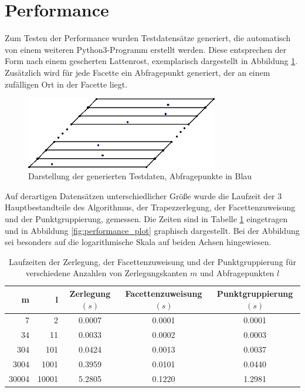 \documentclass[11pt, a4paper]{article}
\begin{document}
\section{Performance}
Zum Testen der Performance wurden Testdatensätze generiert, die automatisch von einem weiteren Python3-Programm erstellt werden. Diese entsprechen der Form nach einem gescherten Lattenrost, exemplarisch dargestellt in Abbildung \ref{fig:generated_dataset}. Zusätzlich wird für jede Facette ein Abfragepunkt generiert, der an einem zufälligen Ort in der Facette liegt.

\begin{figure}[h!]
	\centering
	\includegraphics[width=0.75\textwidth]{generated_dataset}
	\caption{Darstellung der generierten Testdaten, Abfragepunkte in Blau}
	\label{fig:generated_dataset}
\end{figure}

Auf derartigen Datensätzen unterschiedlicher Größe wurde die Laufzeit der 3 Hauptbestandteile des Algorithmus, der Trapezzerlegung, der Facettenzuweisung und der Punktgruppierung, gemessen. Die Zeiten sind in Tabelle \ref{tab:performance_table} eingetragen und in Abbildung \ref{fig:performance_plot} graphisch dargestellt. Bei der Abbildung sei besonders auf die logarithmische Skala auf beiden Achsen hingewiesen.

\begin{table}[h!]
	\centering
	\begin{tabular}{|r|r|c|c|c|}
		\hline
		m & l & Zerlegung $(s)$ & Facettenzuweisung $(s)$ & Punktgruppierung $(s)$ \\
		\hline
		7 & 2 & 0.0007 & 0.0001 & 0.0001 \\
		34 & 11 & 0.0033 & 0.0002 & 0.0003 \\
		304 & 101 & 0.0424 & 0.0013 & 0.0037 \\
		3004 & 1001 & 0.3959 & 0.0101 & 0.0440 \\
		30004 & 10001 & 5.2805 & 0.1220 & 1.2981 \\
		\hline
	\end{tabular}
	\caption{Laufzeiten der Zerlegung, der Facettenzuweisung und der Punktgruppierung für verschiedene Anzahlen von Zerlegungskanten $m$ und Abfragepunkten $l$}
	\label{tab:performance_table}
\end{table}
\end{document}
